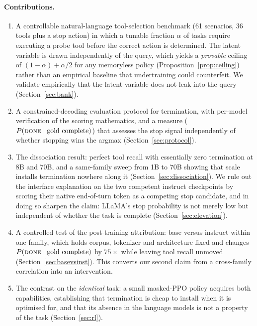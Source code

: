 \documentclass[11pt]{article}
\newcommand{\done}{\ensuremath{\text{\textsc{done}}}}
\begin{document}
\paragraph{Contributions.}
\begin{enumerate}
  \item A controllable natural-language tool-selection benchmark (61 scenarios,
  36 tools plus a stop action) in which a tunable fraction $\alpha$ of tasks
  require executing a probe tool before the correct action is determined. The
  latent variable is drawn independently of the query, which yields a
  \emph{provable} ceiling of $(1-\alpha) + \alpha/2$ for any memoryless policy
  (Proposition~\ref{prop:ceiling}) rather than an empirical baseline that
  undertraining could counterfeit. We validate empirically that the latent
  variable does not leak into the query (Section~\ref{sec:bank}).

  \item A constrained-decoding evaluation protocol for termination, with
  per-model verification of the scoring mathematics, and a measure
  ($P(\done \mid \text{gold complete})$) that assesses the stop signal
  independently of whether stopping wins the arg\-max
  (Section~\ref{sec:protocol}).

  \item The dissociation result: perfect tool recall with essentially zero
  termination at 8B and 70B, and a same-family sweep from 1B to 70B showing that
  scale installs termination nowhere along it (Section~\ref{sec:dissociation}).
  We rule out the interface explanation on the two competent instruct
  checkpoints by scoring their native end-of-turn token as a competing stop
  candidate, and in doing so sharpen the claim: LLaMA's stop probability is not
  merely low but independent of whether the task is complete
  (Section~\ref{sec:elevation}).

  \item A controlled test of the post-training attribution: base versus instruct
  within one family, which holds corpus, tokenizer and architecture fixed and
  changes $P(\done \mid \text{gold complete})$ by $75\times$ while leaving tool
  recall unmoved (Section~\ref{sec:basevsinst}). This converts our second claim
  from a cross-family correlation into an intervention.

  \item The contrast on the \emph{identical} task: a small masked-PPO policy
  acquires both capabilities, establishing that termination is cheap to install
  when it is optimised for, and that its absence in the language models is not a
  property of the task (Section~\ref{sec:rl}).


\end{enumerate}
\end{document}
